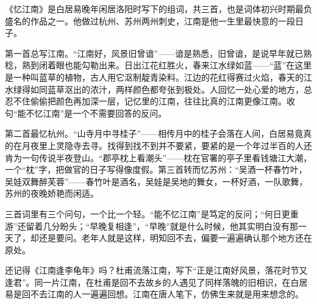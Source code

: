 \begin{appreciation}
《忆江南》是白居易晚年闲居洛阳时写下的组词，共三首，也是词体初兴时期最负盛名的作品之一。他做过杭州、苏州两州刺史，江南是他一生里最快意的一段日子。

第一首总写江南。“江南好，风景旧曾谙”——谙是熟悉，旧曾谙，是说早年就已熟稔，熟到闭着眼也能勾勒出来。日出江花红胜火，春来江水绿如蓝——“蓝”在这里是一种叫蓝草的植物，古人用它沤制靛青染料。江边的花红得赛过火焰，春天的江水绿得如同蓝草沤出的浓汁，两样颜色都夸张到极处。人回忆一处心爱的地方，总忍不住偷偷把颜色再加深一层，记忆里的江南，往往比真的江南更像江南。收句“能不忆江南”是一个不需要回答的反问。

第二首最忆杭州。“山寺月中寻桂子”——相传月中的桂子会落在人间，白居易竟真的在月夜里上灵隐寺去寻。找得到找不到并不要紧，要紧的是一个年过半百的人还肯为一句传说半夜登山。“郡亭枕上看潮头”——枕在官署的亭子里看钱塘江大潮，一个“枕”字，把做官的日子写得像度假。第三首转而忆苏州：“吴酒一杯春竹叶，吴娃双舞醉芙蓉”——春竹叶是酒名，吴娃是吴地的舞女，一杯好酒，一队歌舞，苏州的夜晚娇艳而闲适。

三首词里有三个问句，一个比一个轻。“能不忆江南”是笃定的反问；“何日更重游”还留着几分盼头；“早晚复相逢”，“早晚”就是什么时候，他其实明白没有那一天了，却还是要问。老年人就是这样，明知回不去，偏要一遍遍确认那个地方还在原处。

还记得《江南逢李龟年》吗？杜甫流落江南，写下“正是江南好风景，落花时节又逢君”。同一片江南，在杜甫是回不去故乡的人遇见了同样落魄的旧相识，在白居易是回不去江南的人一遍遍回想。江南在唐人笔下，仿佛生来就是用来想念的。
\end{appreciation}
